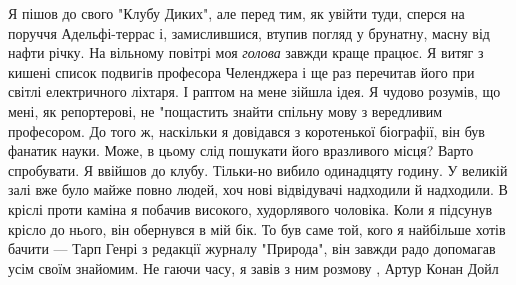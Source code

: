 Я пішов до свого "Клубу Диких", але перед тим, як увійти туди, сперся на
поруччя Адельфі-террас і, замислившися, втупив погляд у брунатну, масну від
нафти річку. На вільному повітрі моя \emph{голова} завжди краще працює. Я витяг з
кишені список подвигів професора Челенджера і ще раз перечитав його при світлі
електричного ліхтаря. І раптом на мене зійшла ідея. Я чудово розумів, що мені,
як репортерові, не "пощастить знайти спільну мову з вередливим професором. До
того ж, наскільки я довідався з коротенької біографії, він був фанатик науки.
Може, в цьому слід пошукати його вразливого місця? Варто спробувати.  Я ввійшов
до клубу. Тільки-но вибило одинадцяту годину. У великій залі вже було майже
повно людей, хоч нові відвідувачі надходили й надходили. В кріслі проти каміна
я побачив високого, худорлявого чоловіка. Коли я підсунув крісло до нього, він
обернувся в мій бік. То був саме той, кого я найбільше хотів бачити — Тарп
Генрі з редакції журналу "Природа", він завжди радо допомагав усім своїм
знайомим. Не гаючи часу, я завів з ним розмову
, Артур Конан Дойл
